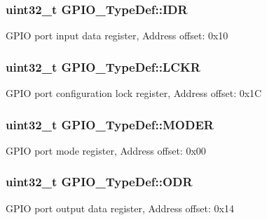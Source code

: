\subsubsection[{\texorpdfstring{I\+DR}{IDR}}]{ uint32\+\_\+t G\+P\+I\+O\+\_\+\+Type\+Def\+::\+I\+DR}\hypertarget{struct_g_p_i_o___type_def_acf11156409414ad8841bb0b62959ee96}{}\label{struct_g_p_i_o___type_def_acf11156409414ad8841bb0b62959ee96}
G\+P\+IO port input data register, Address offset\+: 0x10 
\subsubsection[{\texorpdfstring{L\+C\+KR}{LCKR}}]{ uint32\+\_\+t G\+P\+I\+O\+\_\+\+Type\+Def\+::\+L\+C\+KR}\hypertarget{struct_g_p_i_o___type_def_a95a59d4b1d52be521f3246028be32f3e}{}\label{struct_g_p_i_o___type_def_a95a59d4b1d52be521f3246028be32f3e}
G\+P\+IO port configuration lock register, Address offset\+: 0x1C 
\subsubsection[{\texorpdfstring{M\+O\+D\+ER}{MODER}}]{ uint32\+\_\+t G\+P\+I\+O\+\_\+\+Type\+Def\+::\+M\+O\+D\+ER}\hypertarget{struct_g_p_i_o___type_def_ac2505d096b6b650f1647b8e0ff8b196b}{}\label{struct_g_p_i_o___type_def_ac2505d096b6b650f1647b8e0ff8b196b}
G\+P\+IO port mode register, Address offset\+: 0x00 
\subsubsection[{\texorpdfstring{O\+DR}{ODR}}]{ uint32\+\_\+t G\+P\+I\+O\+\_\+\+Type\+Def\+::\+O\+DR}\hypertarget{struct_g_p_i_o___type_def_a6fb78f4a978a36032cdeac93ac3c9c8b}{}\label{struct_g_p_i_o___type_def_a6fb78f4a978a36032cdeac93ac3c9c8b}
G\+P\+IO port output data register, Address offset\+: 0x14 
